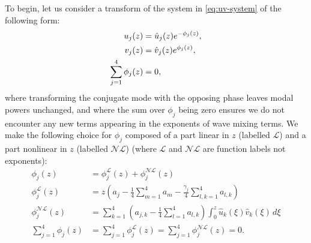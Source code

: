 \documentclass[11pt,a4paper]{article}
\numberwithin{equation}{section}
\begin{document}
To begin, let us consider a transform of the system in \eqref{eq:uv-system} of the following form:
\begin{align}
u_j(z) &= \hat{u}_j(z) e^{- \phi_j(z)}, \notag \\
v_j(z) &= \hat{v}_j(z) e^{\phi_j(z)}, \\
\sum_{j=1}^{4} \phi_j(z) &= 0,
\end{align}
where transforming the conjugate mode with the opposing phase leaves modal powers unchanged, and where the sum over $\phi_j$ being zero ensures we do not encounter any new terms appearing in the exponents of wave mixing terms.
We make the following choice for $\phi_j$ composed of a part linear in $z$ (labelled $\mathcal{L}$) and a part nonlinear in $z$ (labelled $\mathcal{NL}$) (where $\mathcal{L}$ and $\mathcal{NL}$ are function labels not exponents):
\begin{align}
\phi_j(z) &= \phi_j^{\mathcal{L}}(z) + \phi_j^{\mathcal{NL}}(z) \\
\phi_j^{\mathcal{L}}(z) &= z\left({a}_{j} - \frac{1}{4}\sum_{m=1}^{4} a_{m} - \frac{{\gamma}_{j}}{4} \sum\limits_{l,k=1}^{4} a_{l,k}\right) \\
\phi_j^{\mathcal{NL}}(z)  &= \sum_{k=1}^{4} \left({a}_{j,k} - \frac{1}{4}\sum_{l=1}^{4} {a}_{l,k}\right) \int_{0}^{z} \hat{u}_k (\xi) \hat{v}_k (\xi) \, d\xi \\
\sum_{j=1}^{4} \phi_j(z) &= \sum_{j=1}^{4} \phi_j^{\mathcal{L}}(z) = \sum_{j=1}^{4} \phi_j^{\mathcal{NL}}(z) =0.
\end{align}
\end{document}
